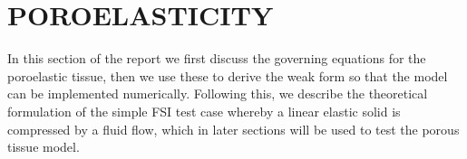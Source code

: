 \documentclass[oneside,11pt,times]{book}
\begin{document}

\section{POROELASTICITY}  \label{sec:poroelasticity}
In this section of the report we first discuss the governing equations for the poroelastic tissue, then we use these to derive the weak form so that the model can be implemented numerically. Following this, we describe the theoretical formulation of the simple FSI test case whereby a linear elastic solid is compressed by a fluid flow, which in later sections will be used to test the porous tissue model.\\
\end{document}

